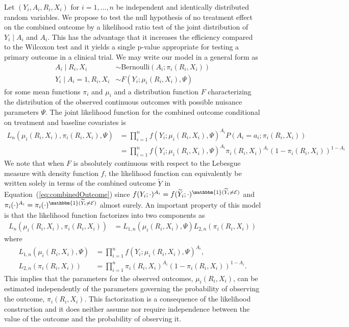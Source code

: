 Let $(Y_i, A_i, R_i, X_i)$ for $i = 1, \ldots, n$ be independent and identically distributed random variables. We propose to test the null hypothesis of no treatment effect on the combined outcome by a likelihood ratio test of the joint distribution of $Y_i \mid A_i$ and $A_i$. This has the advantage that it increases the efficiency compared to the Wilcoxon test and it yields a single p-value appropriate for testing a primary outcome in a clinical trial. We may write our model in a general form as
\begin{align*}
  A_i \mid R_i, X_i &\sim \text{Bernoulli}(A_i; \pi_i(R_i, X_i))\\
  Y_i \mid A_i = 1, R_i, X_i &\sim F(Y_i; \mu_i(R_i, X_i), \Psi)
\end{align*}
for some mean functions $\pi_i$ and $\mu_i$ and a distribution function $F$ characterizing the distribution of the observed continuous outcomes with possible nuisance parameters $\Psi$. The joint likelihood function for the combined outcome conditional on treatment and baseline covariates is
\begin{align*}
  L_n(\mu_i(R_i, X_i), \pi_i(R_i, X_i), \Psi) &= \prod_{i = 1}^n f(Y_i; \mu_i(R_i, X_i), \Psi)^{A_i}P(A_i = a_i; \pi_i(R_i, X_i))\\
  &= \prod_{i = 1}^n f(Y_i; \mu_i(R_i, X_i), \Psi)^{A_i} \pi_i(R_i, X_i)^{A_i} (1 - \pi_i(R_i, X_i))^{1 - A_i}\nonumber
\end{align*}
We note that when $F$ is absolutely continuous with respect to the Lebesgue measure with density function $f$, the likelihood function can equivalently be written solely in terms of the combined outcome $\widetilde{Y}$ in Equation~(\ref{eq:combinedOutcome}) since $f(Y_i; \cdot)^{A_i} = f(\widetilde{Y}_i; \cdot)^{\mathbbm{1}(\widetilde{Y}_i \ne \mathcal{E})}$ and $\pi_i(\cdot)^{A_i} = \pi_i(\cdot)^{\mathbbm{1}(\widetilde{Y}_i \ne \mathcal{E})}$ almost surely. An important property of this model is that the likelihood function factorizes into two components as
\begin{align*}
  L_n(\mu_i(R_i, X_i), \pi_i(R_i, X_i)) &= L_{1,n}(\mu_i(R_i, X_i), \Psi) L_{2,n}(\pi_i(R_i, X_i))
\end{align*}
where
\begin{align*}
  L_{1,n}(\mu_i(R_i, X_i), \Psi) &= \prod_{i = 1}^n f(Y_i; \mu_i(R_i, X_i), \Psi)^{A_i},\\
  L_{2,n}(\pi_i(R_i, X_i)) &= \prod_{i = 1}^n \pi_i(R_i, X_i)^{A_i} (1 - \pi_i(R_i, X_i))^{1 - A_i}.
\end{align*}
This implies that the parameters for the observed outcomes, $\mu_i(R_i, X_i)$, can be estimated independently of the parameters governing the probability of observing the outcome, $\pi_i(R_i, X_i)$. This factorization is a consequence of the likelihood construction and it does neither assume nor require independence between the value of the outcome and the probability of observing it.

